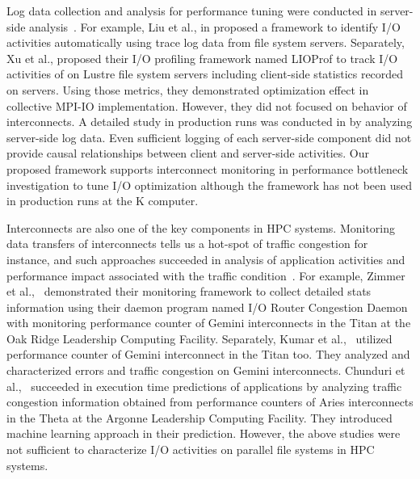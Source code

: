 \documentclass{jhps}
\begin{document}
Log data collection and analysis for performance tuning were conducted in
server-side analysis~\cite{liu:fast2014,liu:sc16,xu:cug16}.
For example, Liu et al., in \cite{liu:fast2014,liu:sc16} proposed
a framework to identify I/O activities automatically
using trace log data from file system servers.
Separately, Xu et al.,\cite{xu:cug16} proposed their I/O profiling framework
named LIOProf to track I/O activities of on Lustre file system servers
including client-side statistics recorded on servers.
Using those metrics, they demonstrated optimization effect
in collective MPI-IO implementation.
However, they did not focused on behavior of interconnects.
A detailed study in production runs was conducted in \cite{patel:sc19}
by analyzing server-side log data.
Even sufficient logging of each server-side component did not provide
causal relationships between client and server-side activities.
Our proposed framework supports interconnect monitoring
in performance bottleneck investigation to tune I/O optimization
although the framework has not been used in production runs at the K computer.

Interconnects are also one of the key components in HPC systems.
Monitoring data transfers of interconnects tells us a hot-spot of traffic congestion
for instance, and such approaches succeeded in analysis of
application activities and performance impact associated with
the traffic condition~\cite{zimmer:cug16,kumar:DSN2018,chunduri:pmbs19}.
For example, Zimmer et al.,~\cite{zimmer:cug16} demonstrated their monitoring framework
to collect detailed stats information using their daemon program named
I/O Router Congestion Daemon with monitoring performance counter
of Gemini interconnects in the Titan at the Oak Ridge Leadership Computing Facility.
Separately, Kumar et al.,~\cite{kumar:DSN2018} utilized performance counter
of Gemini interconnect in the Titan too.
They analyzed and characterized errors and traffic congestion on Gemini interconnects. 
Chunduri et al.,~\cite{chunduri:pmbs19} succeeded in execution time predictions
of applications by analyzing traffic congestion information
obtained from performance counters of Aries interconnects in the Theta
at the Argonne Leadership Computing Facility.
They introduced machine learning approach in their prediction. 
However, the above studies were not sufficient to characterize I/O activities
on parallel file systems in HPC systems.
\end{document}
